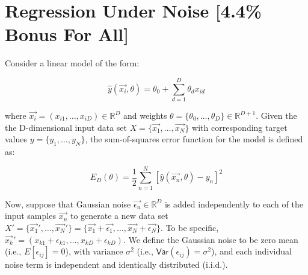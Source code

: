 \section{Regression Under Noise [4.4\% Bonus For All]}

Consider a linear model of the form:

$$\hat{y}(\vec{x_i},\theta) = \theta_0 + \sum_{d=1}^D\theta_dx_{id}$$

where $\vec{x_i} = (x_{i1}, \ldots, x_{iD}) \in \mathbb{R}^{D}$ and weights $\theta = \{\theta_0, \ldots, \theta_D\} \in \mathbb{R}^{D+1}$. Given the the D-dimensional input data set $X = \{ \vec{x_1}, \ldots, \vec{x_N}\}$ with corresponding target values $y = \{y_1, \ldots, y_N\}$, the sum-of-squares error function for the model is defined as:

$$E_D(\theta) = \frac{1}{2}\sum_{n=1}^N\left[\hat{y}(\vec{x_n},\theta)-y_n\right]^2$$

Now, suppose that Gaussian noise $\vec{\epsilon_n} \in \mathbb{R}^{D}$ is added independently to each of the input samples $\vec{x_n}$ to generate a new data set $X'= \{\vec{x_1}', \ldots, \vec{x_N}'\}=\{\vec{x_1}+\vec{\epsilon_1}, \ldots, \vec{x_N}+\vec{\epsilon_N}\}$. To be specific, $\vec{x_k}' = (x_{k1}+\epsilon_{k1}, \ldots, x_{kD}+\epsilon_{kD})$. We define the Gaussian noise to be zero mean (i.e., $E[\epsilon_{ij}]=0$), with variance $\sigma^2$ (i.e., $\mathsf{Var}(\epsilon_{ij})=\sigma^2$), and each individual noise term is independent and identically distributed (i.i.d.).


